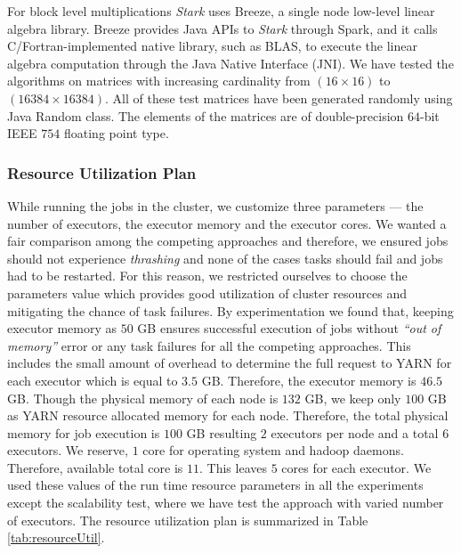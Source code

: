 For block level multiplications \textit{Stark} uses Breeze, a single node low-level linear algebra library. Breeze provides Java APIs to \textit{Stark} through Spark, and it calls C/Fortran-implemented native library, such as BLAS, to execute the linear algebra computation through the Java Native Interface (JNI). We have tested the algorithms on matrices with increasing cardinality from $(16 \times 16)$ to $(16384 \times 16384)$. All of these test matrices have been generated randomly using Java Random class. The elements of the matrices are of double-precision $64$-bit IEEE $754$ floating point type.


\subsubsection{Resource Utilization Plan}


While running the jobs in the cluster, we customize three parameters --- the number of executors, the executor memory and the executor cores. We wanted a fair comparison among the competing approaches and therefore, we ensured jobs should not experience \textit{thrashing} and none of the cases tasks should fail and jobs had to be restarted. For this reason, we restricted ourselves to choose the parameters value which provides good utilization of cluster resources and mitigating the chance of task failures. By experimentation we found that, keeping executor memory as $50$ GB ensures successful execution of jobs without \textit{``out of memory''} error or any task failures for all the competing approaches. This includes the small amount of overhead to determine the full request to YARN for each executor which is equal to $3.5$ GB. Therefore, the executor memory is $46.5$ GB. Though the physical memory of each node is $132$ GB, we keep only $100$ GB as YARN resource allocated memory for each node. Therefore, the total physical memory for job execution is $100$ GB resulting $2$ executors per node and a total $6$ executors.  We reserve, $1$ core for operating system and hadoop daemons. Therefore, available total core is $11$. This leaves $5$ cores for each executor. We used these values of the run time resource parameters in all the experiments except the scalability test, where we have test the approach with varied number of executors. The resource utilization plan is summarized in Table \ref{tab:resourceUtil}.

